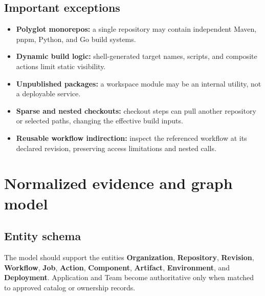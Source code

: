 \documentclass[11pt,letterpaper]{article}
\newcommand{\term}[1]{\textbf{\color{Navy}#1}}
\begin{document}
\subsection{Important exceptions}
\begin{itemize}
\item \term{Polyglot monorepos:} a single repository may contain independent Maven, pnpm, Python, and Go build systems.
\item \term{Dynamic build logic:} shell-generated target names, scripts, and composite actions limit static visibility.
\item \term{Unpublished packages:} a workspace module may be an internal utility, not a deployable service.
\item \term{Sparse and nested checkouts:} checkout steps can pull another repository or selected paths, changing the effective build inputs.
\item \term{Reusable workflow indirection:} inspect the referenced workflow at its declared revision, preserving access limitations and nested calls.
\end{itemize}

\section{Normalized evidence and graph model}
\subsection{Entity schema}
The model should support the entities \term{Organization}, \term{Repository}, \term{Revision}, \term{Workflow}, \term{Job}, \term{Action}, \term{Component}, \term{Artifact}, \term{Environment}, and \term{Deployment}. Application and Team become authoritative only when matched to approved catalog or ownership records.
\end{document}
